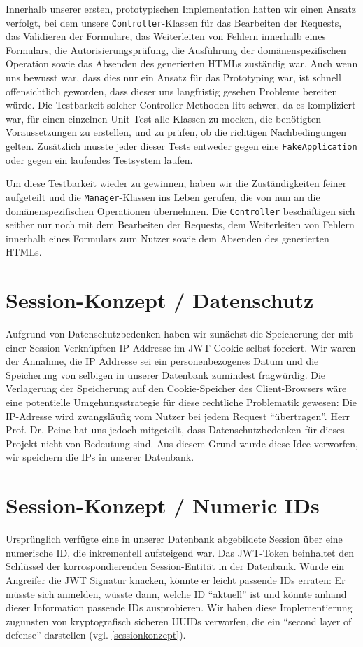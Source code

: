 \documentclass[12pt,DIV14,BCOR10mm,a4paper,parskip=half-,headsepline,headinclude,english,ngerman,bibliography=totocnumbered]{scrreprt}
\begin{document}
Innerhalb unserer ersten, prototypischen Implementation hatten wir einen Ansatz verfolgt, bei dem unsere \texttt{Controller}-Klassen für das Bearbeiten der Requests, das Validieren der Formulare, das Weiterleiten von Fehlern innerhalb eines Formulars, die Autorisierungsprüfung, die Ausführung der domänenspezifischen Operation sowie das Absenden des generierten HTMLs zuständig war.
Auch wenn uns bewusst war, dass dies nur ein Ansatz für das Prototyping war, ist schnell offensichtlich geworden, dass dieser uns langfristig gesehen Probleme bereiten würde.
Die Testbarkeit solcher Controller-Methoden litt schwer, da es kompliziert war, für einen einzelnen Unit-Test alle Klassen zu mocken, die benötigten Voraussetzungen zu erstellen, und zu prüfen, ob die richtigen Nachbedingungen gelten.
Zusätzlich musste jeder dieser Tests entweder gegen eine \texttt{FakeApplication} oder gegen ein laufendes Testsystem laufen.

Um diese Testbarkeit wieder zu gewinnen, haben wir die Zuständigkeiten feiner aufgeteilt und die \texttt{Manager}-Klassen ins Leben gerufen, die von nun an die domänenspezifischen Operationen übernehmen.
Die \texttt{Controller} beschäftigen sich seither nur noch mit dem Bearbeiten der Requests, dem Weiterleiten von Fehlern innerhalb eines Formulars zum Nutzer sowie dem Absenden des generierten HTMLs.

\section{Session-Konzept / Datenschutz}
Aufgrund von Datenschutzbedenken haben wir zunächst die Speicherung der mit einer Session-Verknüpften IP-Addresse im JWT-Cookie selbst forciert. Wir waren der Annahme, die IP Addresse sei ein personenbezogenes Datum und die Speicherung von selbigen in unserer Datenbank zumindest fragwürdig. Die Verlagerung der Speicherung auf den Cookie-Speicher des Client-Browsers wäre eine potentielle Umgehungsstrategie für diese rechtliche Problematik gewesen: Die IP-Adresse wird zwangsläufig vom Nutzer bei jedem Request \enquote{übertragen}. Herr Prof. Dr. Peine hat uns jedoch mitgeteilt, dass Datenschutzbedenken für dieses Projekt nicht von Bedeutung sind. Aus diesem Grund wurde diese Idee verworfen, wir speichern die IPs in unserer Datenbank.

\section{Session-Konzept / Numeric IDs}
Ursprünglich verfügte eine in unserer Datenbank abgebildete Session über eine numerische ID, die inkrementell aufsteigend war. Das JWT-Token beinhaltet den Schlüssel der korrospondierenden Session-Entität in der Datenbank. Würde ein Angreifer die JWT Signatur knacken, könnte er leicht passende IDs erraten: Er müsste sich anmelden, wüsste dann, welche ID \enquote{aktuell} ist und könnte anhand dieser Information passende IDs ausprobieren. Wir haben diese Implementierung zugunsten von kryptografisch sicheren UUIDs verworfen, die ein \enquote{second layer of defense} darstellen (vgl. \ref{sessionkonzept}).
\end{document}
